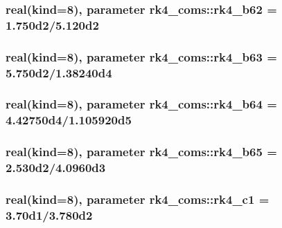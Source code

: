 \subsubsection[{\texorpdfstring{rk4\+\_\+b62}{rk4_b62}}]{\setlength{\rightskip}{0pt plus 5cm}real(kind=8), parameter rk4\+\_\+coms\+::rk4\+\_\+b62 = 1.\+750d2/5.\+120d2}\hypertarget{namespacerk4__coms_a1424e7b77cc58817b30146a6ed80c076}{}\label{namespacerk4__coms_a1424e7b77cc58817b30146a6ed80c076}
\subsubsection[{\texorpdfstring{rk4\+\_\+b63}{rk4_b63}}]{\setlength{\rightskip}{0pt plus 5cm}real(kind=8), parameter rk4\+\_\+coms\+::rk4\+\_\+b63 = 5.\+750d2/1.\+38240d4}\hypertarget{namespacerk4__coms_a2943f8989d0d72c6913d114141dcfe5d}{}\label{namespacerk4__coms_a2943f8989d0d72c6913d114141dcfe5d}
\subsubsection[{\texorpdfstring{rk4\+\_\+b64}{rk4_b64}}]{\setlength{\rightskip}{0pt plus 5cm}real(kind=8), parameter rk4\+\_\+coms\+::rk4\+\_\+b64 = 4.\+42750d4/1.\+105920d5}\hypertarget{namespacerk4__coms_a6738b7b2098994211bfcafa79e4cc584}{}\label{namespacerk4__coms_a6738b7b2098994211bfcafa79e4cc584}
\subsubsection[{\texorpdfstring{rk4\+\_\+b65}{rk4_b65}}]{\setlength{\rightskip}{0pt plus 5cm}real(kind=8), parameter rk4\+\_\+coms\+::rk4\+\_\+b65 = 2.\+530d2/4.\+0960d3}\hypertarget{namespacerk4__coms_a5635aa326f6d3f256b21cb6aaf2d4ed0}{}\label{namespacerk4__coms_a5635aa326f6d3f256b21cb6aaf2d4ed0}
\subsubsection[{\texorpdfstring{rk4\+\_\+c1}{rk4_c1}}]{\setlength{\rightskip}{0pt plus 5cm}real(kind=8), parameter rk4\+\_\+coms\+::rk4\+\_\+c1 = 3.\+70d1/3.\+780d2}\hypertarget{namespacerk4__coms_a1dd142bdfa35986937ac4396a759dda0}{}\label{namespacerk4__coms_a1dd142bdfa35986937ac4396a759dda0}
